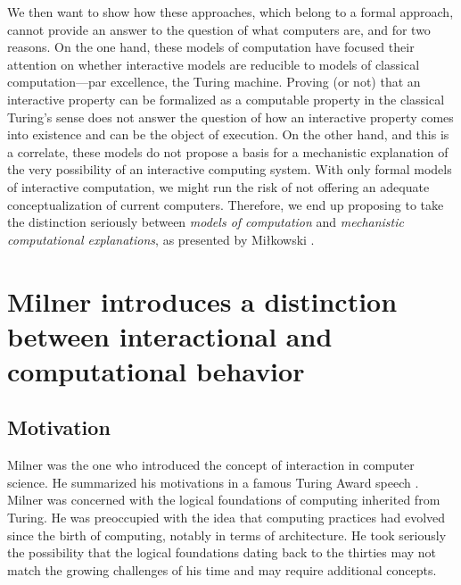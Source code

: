 \documentclass[a4paper, 11pt, twoside]{article}
\begin{document}
We then want to show how these approaches, which belong to a formal approach, cannot provide an answer to the question of what computers are, and for two reasons. On the one hand, these models of computation have focused their attention on whether interactive models are reducible to models of classical computation---par excellence, the Turing machine. Proving (or not) that an interactive property can be formalized as a computable property in the classical Turing’s sense does not answer the question of how an interactive property comes into existence and can be the object of execution. On the other hand, and this is a correlate, these models do not propose a basis for a mechanistic explanation of the very possibility of an interactive computing system. With only formal models of interactive computation, we might run the risk of not offering an adequate conceptualization of current computers. Therefore, we end up proposing to take the distinction seriously between \emph{models of computation} and \emph{mechanistic computational explanations}, as presented by Miłkowski \parencite*{Mikowski2011, Mikowski2014}.

\section{Milner introduces a distinction between interactional and computational behavior}
\label{Milner}

\subsection{Motivation}

Milner was the one who introduced the concept of interaction in computer science. He summarized his motivations in a famous Turing Award speech \parencite{Milner1993}. Milner was concerned with the logical foundations of computing inherited from Turing. He was preoccupied with the idea that computing practices had evolved since the birth of computing, notably in terms of architecture. He took seriously the possibility that the logical foundations dating back to the thirties may not match the growing challenges of his time and may require additional concepts.
\end{document}
